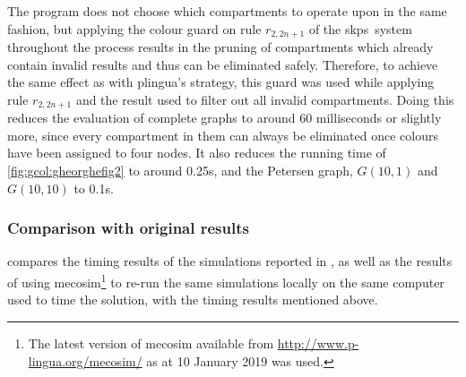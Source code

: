 The \fsharp{} program does not choose which compartments to operate upon in the same fashion, but applying the colour guard on rule \(r_{2,2n+1}\) of the \gls{skps}~system throughout the process results in the pruning of compartments which already contain invalid results and thus can be eliminated safely. Therefore, to achieve the same effect as with \gls{plingua}'s strategy, this guard was used while applying rule \(r_{2,2n+1}\) and the result used to filter out all invalid compartments.  Doing this reduces the evaluation of complete graphs to around 60 milliseconds or slightly more, since every compartment in them can always be eliminated once colours have been assigned to four nodes.  It also reduces the running time of \cref{fig:gcol:gheorghefig2} to around 0.25s, and the Petersen graph, \(G(10,1)\) and \(G(10,10)\) to 0.1s.

\subsubsection{Comparison with original results}

 compares the timing results of the simulations reported in \cite{Gheorghe2013}, as well as the results of using \gls{mecosim}\footnote{The latest version of \gls{mecosim} available from \url{http://www.p-lingua.org/mecosim/} as at 10 January 2019 was used.} \cite{Perez-Hurtado2010} to re-run the same simulations locally on the same computer used to time the \fsharp{} solution, with the timing results mentioned above.

